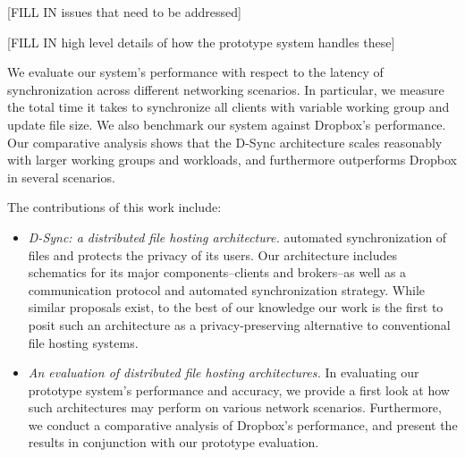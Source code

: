 [FILL IN issues that need to be addressed]

[FILL IN high level details of how the prototype system handles these]

We evaluate our system's performance with respect to the latency
of synchronization across different networking scenarios.
In particular, we measure the total time it takes to synchronize
all clients with variable working group and update file size.
We also benchmark our system against Dropbox's performance.
Our comparative analysis shows that the D-Sync architecture
scales reasonably with larger working groups and workloads,
and furthermore outperforms Dropbox in several scenarios.

The contributions of this work include:
\begin{itemize}
\item \emph{D-Sync: a distributed file hosting architecture.} 
automated synchronization of files and protects the privacy of its users.
Our architecture includes schematics for its major components--clients and brokers--as well as a communication protocol and automated synchronization strategy.
While similar proposals exist, to the best of our knowledge 
our work is the first to posit such an architecture as a privacy-preserving alternative to conventional file hosting systems.
\item \emph{An evaluation of distributed file hosting architectures.}
In evaluating our prototype system's performance and accuracy,
we provide a first look at how such architectures may perform
on various network scenarios.
Furthermore, we conduct a comparative analysis of Dropbox's
performance, and present the results in conjunction with our prototype evaluation.
\end{itemize}

